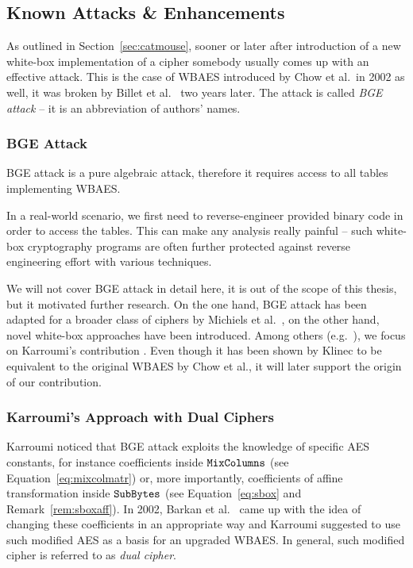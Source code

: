 \subsection{Known Attacks \& Enhancements}
\label{sec:known}

As outlined in Section~\ref{sec:catmouse}, sooner or later after introduction of a new white-box implementation of a cipher somebody usually comes up with an effective attack. This is the case of WBAES introduced by Chow et al.\ in 2002 as well, it was broken by Billet et al.\ \cite{billet2004cryptanalysis} two years later. The attack is called {\em BGE attack} -- it is an abbreviation of authors' names.

\subsubsection{BGE Attack}
	
	BGE attack is a pure algebraic attack, therefore it requires access to all tables implementing WBAES.
	
	\begin{note}
	\label{note:reverse}
		In a real-world scenario, we first need to reverse-engineer provided binary code in order to access the tables. This can make any analysis really painful -- such white-box cryptography programs are often further protected against reverse engineering effort with various techniques.
	\end{note}
	
	We will not cover BGE attack in detail here, it is out of the scope of this thesis, but it motivated further research. On the one hand, BGE attack has been adapted for a broader class of ciphers by Michiels et al.\ \cite{michiels2008cryptanalysis}, on the other hand, novel white-box approaches have been introduced. Among others (e.g.\ \cite{michiels2007cryptographic, xiao2009secure}), we focus on Karroumi's contribution \cite{karroumi2010protecting}. Even though it has been shown by Klinec \cite{klinec2013white} to be equivalent to the original WBAES by Chow et al., it will later support the origin of our contribution.

\subsubsection{Karroumi's Approach with Dual Ciphers}
	
	Karroumi noticed that BGE attack exploits the knowledge of specific AES constants, for instance coefficients inside $\texttt{MixColumns}$ (see Equation~\ref{eq:mixcolmatr}) or, more importantly, coefficients of affine transformation inside $\texttt{SubBytes}$ (see Equation~\ref{eq:sbox} and Remark~\ref{rem:sboxaff}). In 2002, Barkan et al.\ \cite{barkan2002many} came up with the idea of changing these coefficients in an appropriate way and Karroumi suggested to use such modified AES as a basis for an upgraded WBAES. In general, such modified cipher is referred to as {\em dual cipher}.
	
